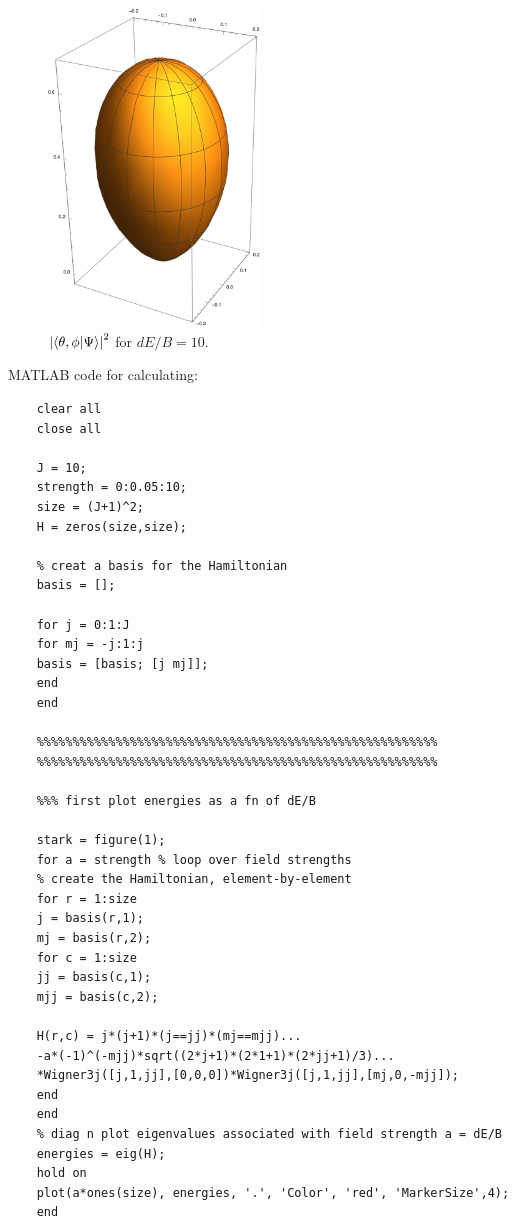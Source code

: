 \documentclass{article}
\theoremstyle{definition}
\begin{document}
\begin{enumerate}[label=(\alph*)]
	\begin{figure}[!htb]
		\centering
		\includegraphics[width=0.5\textwidth]{e10.eps}
		\caption{$\abs{\bra{\theta,\phi}\ket{\Psi}}^2$ for $dE/B=10$.}
		\label{fig:10}
	\end{figure}
	
	
	MATLAB code for calculating:
	\begin{lstlisting}
	clear all
	close all
	
	J = 10;
	strength = 0:0.05:10;
	size = (J+1)^2;
	H = zeros(size,size);
	
	% creat a basis for the Hamiltonian
	basis = [];
	
	for j = 0:1:J
	for mj = -j:1:j
	basis = [basis; [j mj]];
	end
	end
	
	%%%%%%%%%%%%%%%%%%%%%%%%%%%%%%%%%%%%%%%%%%%%%%%%%%%%%%%%
	%%%%%%%%%%%%%%%%%%%%%%%%%%%%%%%%%%%%%%%%%%%%%%%%%%%%%%%%
	
	%%% first plot energies as a fn of dE/B
	
	stark = figure(1);
	for a = strength % loop over field strengths
	% create the Hamiltonian, element-by-element
	for r = 1:size
	j = basis(r,1);
	mj = basis(r,2);
	for c = 1:size     
	jj = basis(c,1);  
	mjj = basis(c,2);
	
	H(r,c) = j*(j+1)*(j==jj)*(mj==mjj)...
	-a*(-1)^(-mjj)*sqrt((2*j+1)*(2*1+1)*(2*jj+1)/3)...
	*Wigner3j([j,1,jj],[0,0,0])*Wigner3j([j,1,jj],[mj,0,-mjj]);             
	end
	end
	% diag n plot eigenvalues associated with field strength a = dE/B
	energies = eig(H);
	hold on 
	plot(a*ones(size), energies, '.', 'Color', 'red', 'MarkerSize',4);
	end
	

\end{lstlisting}
\end{enumerate}
\end{document}
